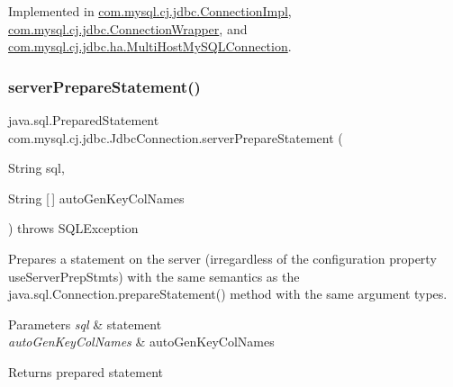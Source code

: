 Implemented in \mbox{\hyperlink{classcom_1_1mysql_1_1cj_1_1jdbc_1_1_connection_impl_a19b32ebaabe6dbd19ce2dd4ca4b3e5eb}{com.\+mysql.\+cj.\+jdbc.\+Connection\+Impl}}, \mbox{\hyperlink{classcom_1_1mysql_1_1cj_1_1jdbc_1_1_connection_wrapper_a9ae046833df9f5a89755a54dd65d43b0}{com.\+mysql.\+cj.\+jdbc.\+Connection\+Wrapper}}, and \mbox{\hyperlink{classcom_1_1mysql_1_1cj_1_1jdbc_1_1ha_1_1_multi_host_my_s_q_l_connection_a5c69e6b4ee9462919ab63d9e3c563294}{com.\+mysql.\+cj.\+jdbc.\+ha.\+Multi\+Host\+My\+S\+Q\+L\+Connection}}.

\mbox{\label{interfacecom_1_1mysql_1_1cj_1_1jdbc_1_1_jdbc_connection_aa15ffc32d47d1950257c4720802694bf}} 
\subsubsection{\texorpdfstring{server\+Prepare\+Statement()}{serverPrepareStatement()}\hspace{0.1cm}{\footnotesize\ttfamily [6/6]}}
{\footnotesize\ttfamily java.\+sql.\+Prepared\+Statement com.\+mysql.\+cj.\+jdbc.\+Jdbc\+Connection.\+server\+Prepare\+Statement (\begin{DoxyParamCaption}\item[{String}]{sql,  }\item[{String \mbox{[}$\,$\mbox{]}}]{auto\+Gen\+Key\+Col\+Names }\end{DoxyParamCaption}) throws S\+Q\+L\+Exception}

Prepares a statement on the server (irregardless of the configuration property \textquotesingle{}use\+Server\+Prep\+Stmts\textquotesingle{}) with the same semantics as the java.\+sql.\+Connection.\+prepare\+Statement() method with the same argument types.


\begin{DoxyParams}{Parameters}
{\em sql} & statement \\
\hline
{\em auto\+Gen\+Key\+Col\+Names} & auto\+Gen\+Key\+Col\+Names \\
\hline
\end{DoxyParams}
\begin{DoxyReturn}{Returns}
prepared statement 
\end{DoxyReturn}

